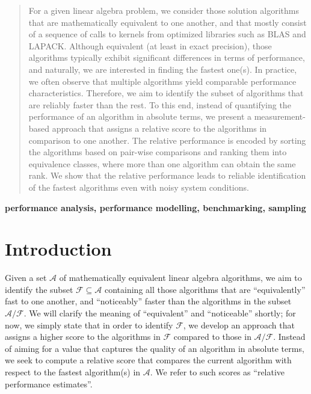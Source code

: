 \documentclass[conference]{IEEEtran}
\begin{document}
\begin{abstract}

  For a given linear algebra problem, we consider those solution algorithms that are mathematically equivalent to one
  another, and that mostly consist of a sequence of calls to kernels from optimized libraries such as BLAS and
  LAPACK. Although equivalent (at least in exact precision), those algorithms typically exhibit significant differences
  in terms of performance, and naturally, we are interested in finding the fastest one(s). In practice, we often observe
  that multiple algorithms yield comparable performance characteristics. Therefore, we aim to identify the subset of algorithms that are reliably faster than the rest. To this end, instead of quantifying the performance of an
  algorithm in absolute terms, we present a measurement-based approach that assigns a relative score to the algorithms
  in comparison to one another. The relative performance is encoded by sorting the algorithms based on pair-wise
  comparisons and ranking them into equivalence classes, where more than one algorithm can obtain the same rank. We show
  that the relative performance leads to reliable identification of the fastest algorithms even with noisy system
  conditions.
\end{abstract}

\begin{IEEEkeywords}
\textbf{performance analysis, performance modelling, benchmarking, sampling}
\end{IEEEkeywords}


\section{Introduction}


Given a set $\mathcal{A}$ of mathematically equivalent linear algebra algorithms, we aim to identify the subset
$\mathcal{F} \subseteq \mathcal{A}$ containing all those algorithms that are ``equivalently'' fast to one another, and
``noticeably'' faster than the algorithms in the subset $\mathcal{A}/\mathcal{F}$. We will clarify the meaning of ``equivalent'' and
``noticeable'' shortly; for now, we simply state that in order to identify $\mathcal{F}$, 
we develop an approach that assigns a higher score to the algorithms in
$\mathcal{F}$ compared to those in $\mathcal{A}/\mathcal{F}$. Instead of aiming for a value that captures the quality of an algorithm in absolute terms, we seek to compute a relative score that compares the current algorithm with respect to the fastest algorithm(s) in $\mathcal{A}$. We refer to such scores as ``relative performance estimates''.
\end{document}
